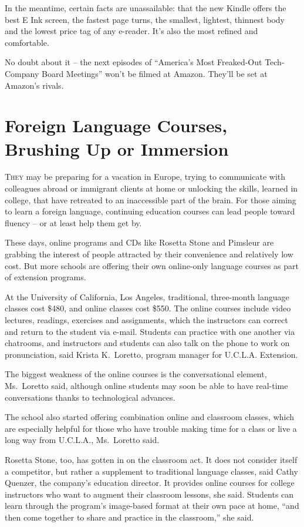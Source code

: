 ﻿\documentclass[12pt]{article}
\begin{document}
In the meantime, certain facts are unassailable: that the new Kindle offers the best E Ink screen,
the fastest page turns, the smallest, lightest, thinnest body and the lowest price tag of any
e-reader. It's also the most refined and comfortable.

No doubt about it -- the next episodes of ``America's Most Freaked-Out Tech-Company Board Meetings''
won't be filmed at Amazon. They'll be set at Amazon's rivals.

\pagebreak
\section{Foreign Language Courses, Brushing Up or Immersion}

\lettrine{T}{hey} may be preparing for a vacation in Europe, trying to
communicate with colleagues abroad or immigrant clients at home or unlocking the skills, learned in
college, that have retreated to an inaccessible part of the brain. For those aiming to learn a
foreign language, continuing education courses can lead people toward fluency -- or at least help
them get by.

These days, online programs and CDs like Rosetta Stone and Pimsleur are grabbing the interest of
people attracted by their convenience and relatively low cost. But more schools are offering their
own online-only language courses as part of extension programs.

At the University of California, Los Angeles, traditional, three-month language classes cost \$480,
and online classes cost \$550. The online courses include video lectures, readings, exercises and
assignments, which the instructors can correct and return to the student via e-mail. Students can
practice with one another via chatrooms, and instructors and students can also talk on the phone to
work on pronunciation, said Krista K.~Loretto, program manager for U.C.L.A. Extension.

The biggest weakness of the online courses is the conversational element, Ms.~Loretto said, although
online students may soon be able to have real-time conversations thanks to technological advances.

The school also started offering combination online and classroom classes, which are especially
helpful for those who have trouble making time for a class or live a long way from U.C.L.A.,
Ms.~Loretto said.

Rosetta Stone, too, has gotten in on the classroom act. It does not consider itself a competitor,
but rather a supplement to traditional language classes, said Cathy Quenzer, the company's education
director. It provides online courses for college instructors who want to augment their classroom
lessons, she said. Students can learn through the program's image-based format at their own pace at
home, ``and then come together to share and practice in the classroom,'' she said.
\end{document}
